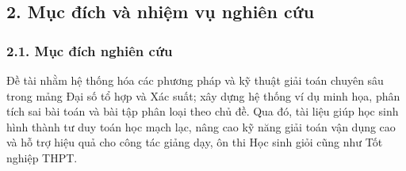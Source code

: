 \documentclass[12pt, a4paper]{article}
\begin{document}
	\subsection*{2. Mục đích và nhiệm vụ nghiên cứu}
	
	\subsubsection*{2.1. Mục đích nghiên cứu}
	Đề tài nhằm hệ thống hóa các phương pháp và kỹ thuật giải toán chuyên sâu trong mảng Đại số tổ hợp và Xác suất; xây dựng hệ thống ví dụ minh họa, phân tích sai bài  toán và bài tập phân loại theo chủ đề. Qua đó, tài liệu giúp học sinh hình thành tư duy toán học mạch lạc, nâng cao kỹ năng giải toán vận dụng cao và hỗ trợ hiệu quả cho công tác giảng dạy, ôn thi Học sinh giỏi cũng như Tốt nghiệp THPT.
	
\end{document}
